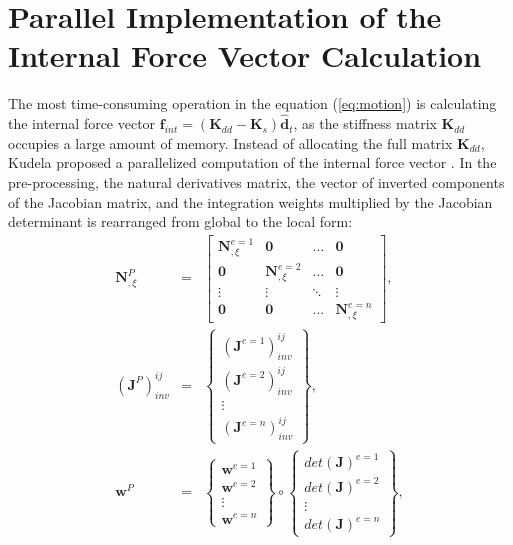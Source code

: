 \documentclass[11pt,a4paper,final]{report}
\begin{document}
 \section{Parallel Implementation of the Internal Force Vector Calculation}
\label{sec:gpu}


The most time-consuming operation in the equation (\ref{eq:motion}) is calculating the internal force vector \(\textbf{f}_{int}=\left(\textbf{K}_{dd}-\textbf{K}_{s}\right)\widehat{\textbf{d}}_{t}\), as the stiffness matrix \(\textbf{K}_{dd}\) occupies a large amount of memory.
Instead of allocating the full matrix \(\textbf{K}_{dd}\), Kudela proposed a parallelized computation of the internal force vector \cite{kudela2016parallel}.
In the pre-processing, the natural derivatives matrix, the vector of inverted components of the Jacobian matrix, and the integration weights multiplied by the Jacobian determinant is rearranged from global to the local form:
\begin{eqnarray}
	\label{eq:isoparametric}
	\textbf{N}^P_{,\xi} & = & \left[ \begin{array}{cccc}
		\textbf{N}^{e=1}_{,\xi} & \textbf{0} & \ldots & \textbf{0}\\
		\textbf{0} & \textbf{N}^{e=2}_{,\xi} & \ldots & \textbf{0}\\
		\vdots & \vdots &  \ddots & \vdots\\
		\textbf{0} & \textbf{0} & \ldots & \textbf{N}^{e=n}_{,\xi}
	\end{array}\right],\\
	\label{eq:jacob}
	\left(\textbf{J}^P\right)^{ij}_{inv} & = & \left\{ \begin{array}{c}
		\left(\textbf{J}^{e=1}\right)^{ij}_{inv}\\
		\left(\textbf{J}^{e=2}\right)^{ij}_{inv}\\
		\vdots\\
		\left(\textbf{J}^{e=n}\right)^{ij}_{inv} \end{array}\right\},\\
	\label{eq:intWeights}
	\textbf{w}^P & = & \left\{ \begin{array}{c}
		\textbf{w}^{e=1}\\
		\textbf{w}^{e=2}\\
		\vdots\\
		\textbf{w}^{e=n} \end{array}\right\} \circ
	\left\{ \begin{array}{c}
		det(\textbf{J})^{e=1}\\
		det(\textbf{J})^{e=2}\\
		\vdots\\
		det(\textbf{J})^{e=n} \end{array}\right\},
\end{eqnarray}
\end{document}
